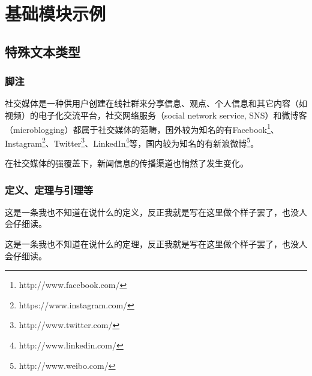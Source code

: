 \documentclass[a4paper,AutoFakeBold,oneside,12pt]{book}
\begin{document}
\tableofcontents %
\thispagestyle{empty}


\newpage\mainmatter
{}


\chapter{基础模块示例}


\section{特殊文本类型}
\subsection{脚注}
社交媒体是一种供用户创建在线社群来分享信息、观点、个人信息和其它内容（如视频）的电子化交流平台，社交网络服务（social network service, SNS）和微博客（microblogging）都属于社交媒体的范畴\cite{webster_social_media}，国外较为知名的有Facebook\footnote{http://www.facebook.com/}、Instagram\footnote{https://www.instagram.com/}、Twitter\footnote{http://www.twitter.com/}、LinkedIn\footnote{http://www.linkedin.com/}等，国内较为知名的有新浪微博\footnote{http://www.weibo.com/}。

在社交媒体的强覆盖下，新闻信息的传播渠道也悄然了发生变化。\cite{false_news_spread_2018}

\subsection{定义、定理与引理等}
\begin{definition}
这是一条我也不知道在说什么的定义，反正我就是写在这里做个样子罢了，也没人会仔细读。\cite{周兴2017基于深度学习的谣言检测及模式挖掘}
\end{definition}

\begin{theorem}
这是一条我也不知道在说什么的定理，反正我就是写在这里做个样子罢了，也没人会仔细读。
\end{theorem}
\end{document}
